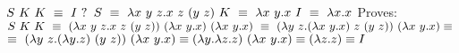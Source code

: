 \documentclass[12pt]{article}
\begin{document}
$S\ K\ K\ \equiv\ I\ ?\\ $
$S\ \equiv\ \lambda x\ y\ z.x\ z\ (y\ z)\ K\ \equiv\ \lambda x\ y.x\ I\ \equiv\ \lambda x.x\\ $
Proves:\\
$S\ K\ K\ \equiv\ (\lambda x\ y\ z.x\ z\ (y\ z))\ (\lambda x\ y.x)\ (\lambda x\ y.x)\
\equiv\ (\lambda y\ z.(\lambda x\ y.x)\ z\ (y\ z))\ (\lambda x\ y.x) \equiv\\ $
$\equiv\ (\lambda y\ z.(\lambda y.z)\ (y\ z))\ (\lambda x\ y.x) 
\equiv (\lambda y.\lambda z.z)\ (\lambda x\ y.x) \equiv (\lambda z.z) \equiv I\\$
\end{document}

